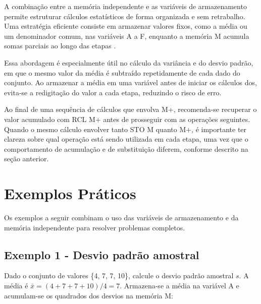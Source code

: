 A combinação entre a memória independente e as variáveis de armazenamento permite estruturar cálculos estatísticos de forma organizada e sem retrabalho. Uma estratégia eficiente consiste em armazenar valores fixos, como a média ou um denominador comum, nas variáveis A a F, enquanto a memória M acumula somas parciais ao longo das etapas \cite{casio2004}.

Essa abordagem é especialmente útil no cálculo da variância e do desvio padrão, em que o mesmo valor da média é subtraído repetidamente de cada dado do conjunto. Ao armazenar a média em uma variável antes de iniciar os cálculos dos, evita-se a redigitação do valor a cada etapa, reduzindo o risco de erro.

Ao final de uma sequência de cálculos que envolva M+, recomenda-se recuperar o valor acumulado com RCL M+ antes de prosseguir com as operações seguintes. Quando o mesmo cálculo envolver tanto STO M quanto M+, é importante ter clareza sobre qual operação está sendo utilizada em cada etapa, uma vez que o comportamento de acumulação e de substituição diferem, conforme descrito na seção anterior.

\section{Exemplos Práticos}

Os exemplos a seguir combinam o uso das variáveis de armazenamento e da memória independente para resolver problemas completos.

\subsection*{Exemplo 1 - Desvio padrão amostral}

Dado o conjunto de valores \{4, 7, 7, 10\}, calcule o desvio padrão amostral $s$. A média é $\bar{x} = (4 + 7 + 7 + 10)/4 = 7$. Armazena-se a média na variável A e acumulam-se os quadrados dos desvios na memória M:


